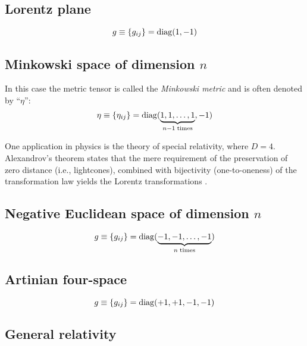 \subsection*{Lorentz plane}


\begin{equation}
g\equiv \{g_{ij}\}={\rm diag} (1,-1)
\end{equation}

\subsection*{Minkowski space of dimension $n$}

In this case the metric tensor is called the
{\em Minkowski metric}
and is often denoted by  ``$\eta$'':
\begin{equation}
\eta \equiv \{\eta_{ij}\}={\rm diag} (\underbrace{1,1,\ldots ,1}_{n-1\; {\rm times}},-1)
\label{2012-m-ch-tensor-minspn}
\end{equation}


One application in physics is the theory of special relativity,
where $D=4$.
Alexandrov's theorem states that the mere requirement of the preservation of
zero distance (i.e., lightcones), combined with bijectivity (one-to-oneness) of the transformation law
yields the Lorentz transformations
\cite[-40mm]{alex1,alex2,alex3,alex-col,borchers-heger,benz,lester,svozil-2001-convention}.



\subsection*{Negative Euclidean space of dimension $n$}

\begin{equation}
g\equiv \{g_{ij}\}={\rm diag} (\underbrace{-1,-1,\ldots ,-1}_{n\; {\rm times}})
\end{equation}

\subsection*{Artinian four-space}

\begin{equation}
g\equiv \{g_{ij}\}={\rm diag} (+1,+1,-1 ,-1)
\end{equation}



\subsection*{General relativity}

